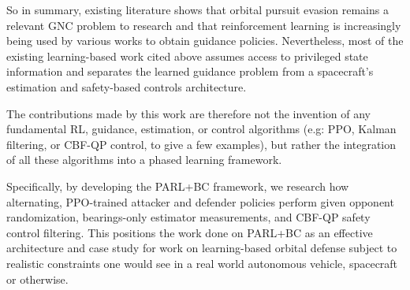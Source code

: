 So in summary, existing literature shows that orbital pursuit evasion remains a relevant GNC problem to research and that reinforcement learning is increasingly being used by various works to obtain guidance policies. Nevertheless, most of the existing learning-based work cited above assumes access to privileged state information and separates the learned guidance problem from a spacecraft's estimation and safety-based controls architecture. 

The contributions made by this work are therefore not the invention of any fundamental RL, guidance, estimation, or control algorithms (e.g: PPO, Kalman filtering, or CBF-QP control, to give a few examples), but rather the integration of all these algorithms into a phased learning framework.

Specifically, by developing the PARL+BC framework, we research how alternating, PPO-trained attacker and defender policies perform given opponent randomization, bearings-only estimator measurements, and CBF-QP safety control filtering. This positions the work done on PARL+BC as an effective architecture and case study for work on learning-based orbital defense subject to realistic constraints one would see in a real world autonomous vehicle, spacecraft or otherwise.

